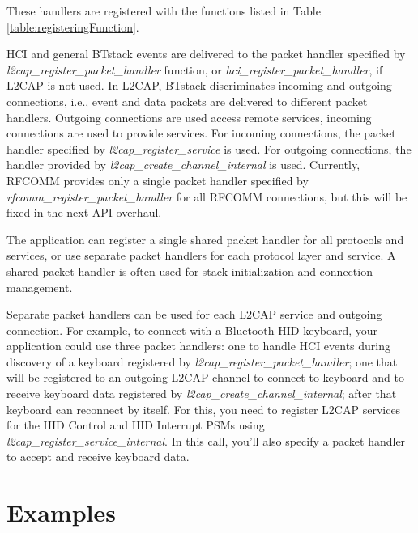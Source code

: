 \documentclass[a4paper,titlepage,oneside,12pt]{amsart} %
\newcommand{\urlfoot}[2]{\href{#1}{{\color{blue} #2}}\footnote{#1}}
\begin{document}
These handlers are registered with the functions listed in Table \ref{table:registeringFunction}. 

HCI and general BTstack events are delivered to the packet handler specified by \emph{l2cap\_register\_packet\_handler} function, or \emph{hci\_register\_packet\_handler}, if L2CAP is not used. In L2CAP, BTstack discriminates incoming and outgoing connections, i.e., event and data packets are delivered to different packet handlers. Outgoing connections are used access remote services, incoming connections are used to provide services. For incoming connections, the packet handler specified by \emph{l2cap\_register\_service} is used. For outgoing connections, the handler provided by \emph{l2cap\_create\_channel\_internal} is used.
Currently, RFCOMM provides only a single packet handler specified by \emph{rfcomm\_register\_packet\_handler} for all RFCOMM connections, but this will be fixed in the next API overhaul.
 
The application can register a single shared packet handler for all protocols and services, or use separate packet handlers for each protocol layer and service. A shared packet handler is often used for stack initialization and connection management.

Separate packet handlers can be used for each L2CAP service and outgoing connection. For example, to connect with a Bluetooth HID keyboard, your application could use three packet handlers: one to handle HCI events during discovery of a keyboard registered by \emph{l2cap\_register\_packet\_handler}; one that will be registered to an outgoing L2CAP channel to connect to keyboard and to receive keyboard data registered by \emph{l2cap\_create\_channel\_internal}; after that keyboard can reconnect by itself. For this, you need to register L2CAP services for the HID Control and HID Interrupt PSMs using \emph{l2cap\_register\_service\_internal}. In this call, you'll also specify a packet handler to accept and receive keyboard data. 

\newcommand{\BluetoothSpecification}{\urlfoot{https://www.bluetooth.org/Technical/Specifications/adopted.htm}{Bluetooth Specification}}
\newcommand{\BluetoothSpecificationURL}{\href{https://www.bluetooth.org/Technical/Specifications/adopted.htm}{\color{blue} Bluetooth Specification}}



\pagebreak
\section{Examples}
\end{document}
